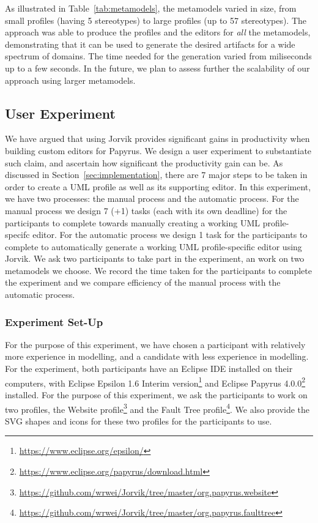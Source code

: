 As illustrated in Table~\ref{tab:metamodels}, the metamodels varied in size, from small profiles (having 5 stereotypes) to large profiles (up to 57 
stereotypes). 
The approach was able to produce the profiles and the editors for \textit{all} the metamodels, demonstrating that it can be used to generate the 
desired artifacts for a wide spectrum of domains. 
The time needed for the generation varied from miliseconds up to a few seconds. 
In the future, we plan to assess further the scalability of our approach using larger metamodels.

\subsection{User Experiment}
We have argued that using Jorvik provides significant gains in productivity when building custom editors for Papyrus.
We design a user experiment to substantiate such claim, and ascertain how significant the productivity gain can be.
As discussed in Section~\ref{sec:implementation}, there are 7 major steps to be taken in order to create a UML profile as well as its supporting editor. 
In this experiment, we have two processes: the manual process and the automatic process.
For the manual process we design 7 (+1) tasks (each with its own deadline) for the participants to complete towards manually creating a working UML profile-specifc editor.
For the automatic process we design 1 task for the participants to complete to automatically generate a working UML profile-specific editor using Jorvik.
We ask two participants to take part in the experiment, an work on two metamodels we choose. 
We record the time taken for the participants to complete the experiment and we compare efficiency of the manual process with the automatic process.

\subsubsection{Experiment Set-Up}
For the purpose of this experiment, we have chosen a participant with relatively more experience in modelling, and a candidate with less experience in modelling. 
For the experiment, both participants have an Eclipse IDE installed on their computers, with Eclipse Epsilon 1.6 Interim version\footnote{\url{https://www.eclipse.org/epsilon/}} and Eclipse Papyrus 4.0.0\footnote{\url{https://www.eclipse.org/papyrus/download.html}} installed.
For the purpose of this experiment, we ask the participants to work on two profiles, the Website profile\footnote{\url{https://github.com/wrwei/Jorvik/tree/master/org.papyrus.website}} and the Fault Tree profile\footnote{\url{https://github.com/wrwei/Jorvik/tree/master/org.papyrus.faulttree}}.
We also provide the SVG shapes and icons for these two profiles for the participants to use.

